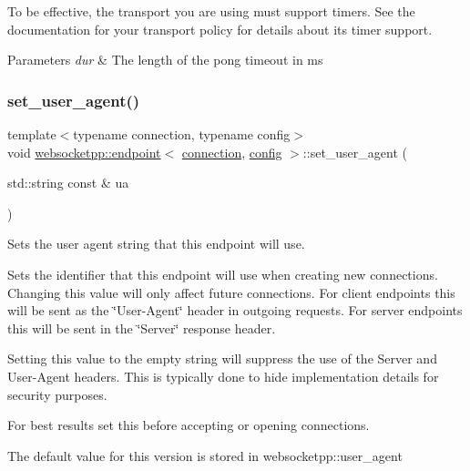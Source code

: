 To be effective, the transport you are using must support timers. See the documentation for your transport policy for details about its timer support.


\begin{DoxyParams}{Parameters}
{\em dur} & The length of the pong timeout in ms \\
\hline
\end{DoxyParams}
\mbox{\label{classwebsocketpp_1_1endpoint_a06a703c52196d900d1e58b79d6657cc8}} 
\subsubsection{\texorpdfstring{set\+\_\+user\+\_\+agent()}{set\_user\_agent()}}
{\footnotesize\ttfamily template$<$typename connection, typename config$>$ \\
void \mbox{\hyperlink{classwebsocketpp_1_1endpoint}{websocketpp\+::endpoint}}$<$ \mbox{\hyperlink{classwebsocketpp_1_1connection}{connection}}, \mbox{\hyperlink{classconfig}{config}} $>$\+::set\+\_\+user\+\_\+agent (\begin{DoxyParamCaption}\item[{std\+::string const \&}]{ua }\end{DoxyParamCaption})\hspace{0.3cm}{\ttfamily [inline]}}



Sets the user agent string that this endpoint will use. 

Sets the identifier that this endpoint will use when creating new connections. Changing this value will only affect future connections. For client endpoints this will be sent as the \char`\"{}\+User-\/\+Agent\char`\"{} header in outgoing requests. For server endpoints this will be sent in the \char`\"{}\+Server\char`\"{} response header.

Setting this value to the empty string will suppress the use of the Server and User-\/\+Agent headers. This is typically done to hide implementation details for security purposes.

For best results set this before accepting or opening connections.

The default value for this version is stored in websocketpp\+::user\+\_\+agent

